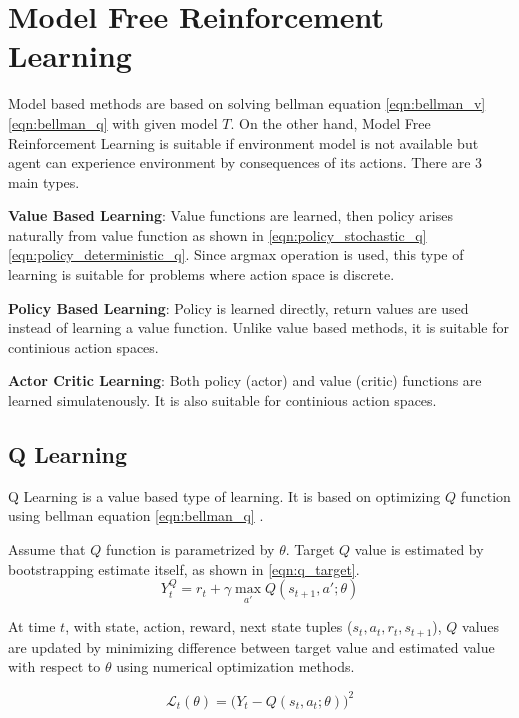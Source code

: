 \section{Model Free Reinforcement Learning}
\label{sec:mf_rl}

Model based methods are based on solving bellman equation \ref{eqn:bellman_v}\ref{eqn:bellman_q} with given model $T$. On the other hand, Model Free Reinforcement Learning is suitable if environment model is not available but agent can experience environment by consequences of its actions. There are 3 main types.

\textbf{Value Based Learning}: Value functions are learned, then policy arises naturally from value function as shown in \ref{eqn:policy_stochastic_q} \ref{eqn:policy_deterministic_q}. Since argmax operation is used, this type of learning is suitable for problems where action space is discrete.

\textbf{Policy Based Learning}: Policy is learned directly, return values are used instead of learning a value function. Unlike value based methods, it is suitable for continious action spaces.

\textbf{Actor Critic Learning}: Both policy (actor) and value (critic) functions are learned simulatenously. It is also suitable for continious action spaces. 

\subsection{Q Learning}
Q Learning is a value based type of learning. It is based on optimizing $Q$ function using bellman equation \ref{eqn:bellman_q} \cite{watkins_technical_1992}. 

Assume that $Q$ function is parametrized by $\theta$. Target $Q$ value is estimated by bootstrapping estimate itself, as shown in  \eqref{eqn:q_target}. 
%
\begin{equation}
\label{eqn:q_target}
Y_t^Q = r_t + \gamma \max_{a'} Q(s_{t+1},a';\theta)
\end{equation}

At time $t$,  with state, action, reward, next state tuples ($s_t,a_t,r_t,s_{t+1}$), $Q$ values are updated by minimizing difference between target value and estimated value with respect to $\theta$ using numerical optimization methods.

\begin{equation}
\label{eqn:q_loss}
\mathcal{L}_t(\theta) = \big( Y_t - Q(s_t,a_t;\theta) \big) ^ 2
\end{equation}

